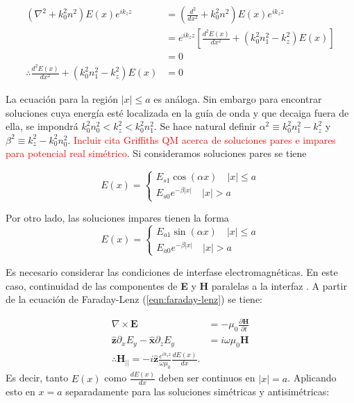 \begin{align*}
(\nabla^2  + k_0^2n^2) E(x)e^{ik_z z} &=  \left(\frac{d^2}{dx^2} + k_0^2n^2\right) E(x)e^{ik_z z } 
\\
&= e^{ik_z z}\left[\frac{d^2  E(x)}{dx^2}  + (k_0^2n_1^2 -  k_z^2)E(x) \right]
\\
&=0
\\
\therefore \frac{d^2  E(x)}{dx^2}  + (k_0^2n_1^2 -  k_z^2)E(x) &= 0
\end{align*}

La ecuación para la región $|x|\le a$ es análoga. Sin embargo para encontrar soluciones cuya energía esté localizada en la guía de onda y que decaiga fuera de ella, se impondrá $k_0^2n_0^2 < k_z^2 < k_0^2n_1^2$. Se hace natural definir $\alpha^2\equiv k_0^2n_1^2-k_z^2$ y $\beta^2\equiv k_z^2 - k_0^2n_0^2$. \textcolor{red}{Incluir cita Griffiths QM acerca de soluciones pares e impares para potencial real simétrico}. Si consideramos soluciones pares se tiene

\begin{equation*}
	E(x) = \left\{\begin{matrix}
	E_{s1}\cos(\alpha x)\quad |x|\le a
	\\
	E_{s0}e^{-\beta|x|} \quad |x|>a
	\end{matrix}\right.
\end{equation*}

Por otro lado, las soluciones impares tienen la forma
\begin{equation*}
	E(x) = \left\{\begin{matrix}
	E_{a1}\sin(\alpha x)\quad |x|\le a
	\\
	E_{a0}e^{-\beta|x|} \quad |x|>a
	\end{matrix}\right.
\end{equation*}


Es necesario considerar las condiciones de interfase electromagnéticas. En este caso, continuidad de las componentes de \textbf{E} y \textbf{H} paralelas a la interfaz . A partir de la ecuación de Faraday-Lenz (\ref{eqn:faraday-lenz}) se tiene:

\begin{align*}
	\nabla\times\textbf{E} &= -\mu_0\frac{\partial \textbf{H}}{\partial t}
	\\
	\mathbf{\hat{z}}\partial_x E_y-\mathbf{\hat{x}}\partial_z E_y  &= i\omega \mu_0  \textbf{H}
	\\	
	\therefore \textbf{H}_{||} = -i\mathbf{\hat{z}}\frac{e^{ik_z z}}{\omega\mu_0}\frac{d E(x)}{dx}.
\end{align*}
Es decir, tanto $E(x)$ como $\frac{dE(x)}{dx}$ deben ser continuos en $|x|=a$. Aplicando esto en $x=a$ separadamente para las soluciones simétricas y antisimétricas:

